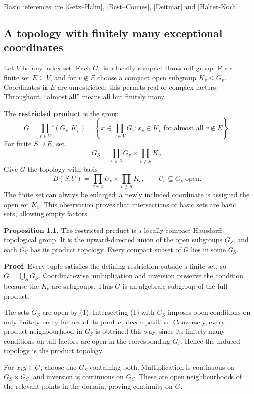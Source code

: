 \documentclass[
  english,
  11pt,
  a4paper,
]{article}
\begin{document}
Basic references are {[}Getz--Hahn{]}, {[}Bost--Connes{]}, {[}Deitmar{]}
and {[}Halter-Koch{]}.

\subsection{A topology with finitely many exceptional
coordinates}\label{NT-ADL-01--a-topology-with-finitely-many-exceptional-coordinates}

Let \(V\) be any index set. Each \(G_v\) is a locally compact Hausdorff
group. Fix a finite set \(E\subseteq V\), and for \(v\notin E\) choose a
compact open subgroup \(K_v\leq G_v\). Coordinates in \(E\) are
unrestricted; this permits real or complex factors. Throughout, ``almost
all'' means all but finitely many.

The \textbf{restricted product} is the group
\[G=\prod_{v\in V}'(G_v,K_v)
=\left\{x\in\prod_{v\in V}G_v:
x_v\in K_v\text{ for almost all }v\notin E\right\}.\] For finite
\(S\supseteq E\), set
\[G_S=\prod_{v\in S}G_v\times\prod_{v\notin S}K_v.\] Give \(G\) the
topology with basis
\[B(S;U)=\prod_{v\in S}U_v\times\prod_{v\notin S}K_v,
\qquad U_v\subseteq G_v\text{ open}.
\tag{1}\] The finite set can always be enlarged: a newly included
coordinate is assigned the open set \(K_v\). This observation proves
that intersections of basic sets are basic sets, allowing empty factors.

\textbf{Proposition 1.1.} The restricted product is a locally compact
Hausdorff topological group. It is the upward-directed union of the open
subgroups \(G_S\), and each \(G_S\) has its product topology. Every
compact subset of \(G\) lies in some \(G_S\).

\textbf{Proof.} Every tuple satisfies the defining restriction outside a
finite set, so \(G=\bigcup_SG_S\). Coordinatewise multiplication and
inversion preserve the condition because the \(K_v\) are subgroups. Thus
\(G\) is an algebraic subgroup of the full product.

The sets \(G_S\) are open by (1). Intersecting (1) with \(G_S\) imposes
open conditions on only finitely many factors of its product
decomposition. Conversely, every product neighbourhood in \(G_S\) is
obtained this way, since its finitely many conditions on tail factors
are open in the corresponding \(G_v\). Hence the induced topology is the
product topology.

For \(x,y\in G\), choose one \(G_S\) containing both. Multiplication is
continuous on \(G_S\times G_S\), and inversion is continuous on \(G_S\).
These are open neighbourhoods of the relevant points in the domain,
proving continuity on \(G\).
\end{document}
